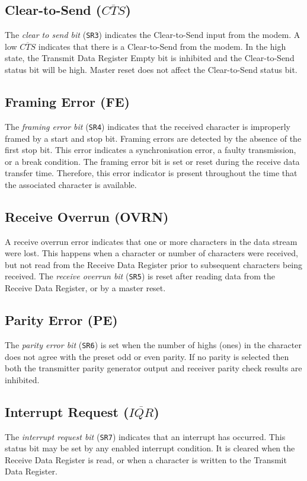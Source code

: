 \documentclass[a4paper,11pt,twoside,openright]{report}
\newcommand{\code}{\texttt}
\begin{document}
\subsection*{Clear-to-Send ($\overline{CTS}$)}
The \textit{clear to send bit} (\code{SR3}) indicates the Clear-to-Send input from the modem. A low $\overline{CTS}$ indicates that there is a Clear-to-Send from the modem. In the high state, the Transmit Data Register Empty bit is inhibited and the Clear-to-Send status bit will be high. Master reset does not affect  the Clear-to-Send status bit.

\subsection*{Framing Error (FE)}
The \textit{framing error bit} (\code{SR4}) indicates that the received character is improperly framed by a start and stop bit. Framing errors are detected by the absence of the first stop bit. This error indicates a synchronisation error, a faulty transmission, or a break condition. The framing error bit is set or reset during the receive data transfer time. Therefore, this error indicator is present throughout the time that the associated character is available.

\subsection*{Receive Overrun (OVRN)}
A receive overrun error indicates that one or more characters in the data stream were lost. This happens when a character or number of characters were received, but not read from the Receive Data Register prior to subsequent characters being received. The \textit{receive overrun bit} (\code{SR5}) is reset after reading data from the Receive Data Register, or by a master reset.

\subsection*{Parity Error (PE)}
The \textit{parity error bit} (\code{SR6}) is set when the number of highs (ones) in the character does not agree with the preset odd or even parity. If no parity is selected then both the transmitter parity generator output and receiver parity check results are inhibited.

\subsection*{Interrupt Request ($\overline{IQR}$)}
The \textit{interrupt request bit} (\code{SR7}) indicates that an interrupt has occurred. This status bit may be set by any enabled interrupt condition. It is cleared when the Receive Data Register is read, or when a character is written to the Transmit Data Register.
\end{document}

